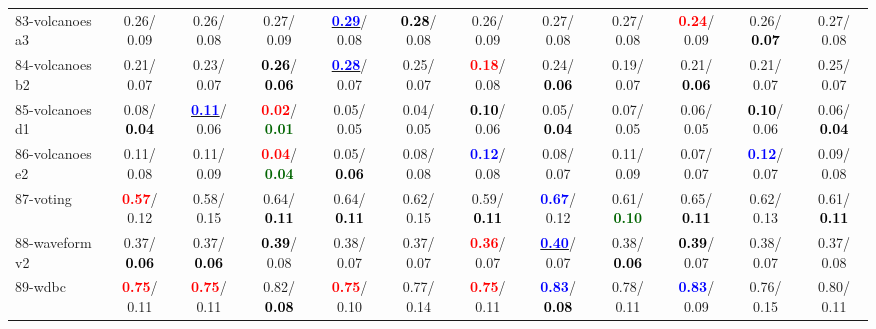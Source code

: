 \begin{table}[h]
\begin{center}
{\begin{tabular}{lc|c|c|c|c|c|c|c|c|c|c}
83-volcanoes a3 &   0.26/  0.09 &   0.26/  0.08 &   0.27/  0.09 & \underline{\textcolor{blue}{\textbf{  0.29}}}/  0.08 & \textcolor{black}{\textbf{  0.28}}/  0.08 &   0.26/  0.09 &   0.27/  0.08 &   0.27/  0.08 & \textcolor{red}{\textbf{  0.24}}/  0.09 &   0.26/\textcolor{black}{\textbf{  0.07}} &   0.27/  0.08 \\
84-volcanoes b2 &   0.21/  0.07 &   0.23/  0.07 & \textcolor{black}{\textbf{  0.26}}/\textcolor{black}{\textbf{  0.06}} & \underline{\textcolor{blue}{\textbf{  0.28}}}/  0.07 &   0.25/  0.07 & \textcolor{red}{\textbf{  0.18}}/  0.08 &   0.24/\textcolor{black}{\textbf{  0.06}} &   0.19/  0.07 &   0.21/\textcolor{black}{\textbf{  0.06}} &   0.21/  0.07 &   0.25/  0.07 \\
85-volcanoes d1 &   0.08/\textcolor{black}{\textbf{  0.04}} & \underline{\textcolor{blue}{\textbf{  0.11}}}/  0.06 & \textcolor{red}{\textbf{  0.02}}/\textcolor{darkgreen}{\textbf{  0.01}} &   0.05/  0.05 &   0.04/  0.05 & \textcolor{black}{\textbf{  0.10}}/  0.06 &   0.05/\textcolor{black}{\textbf{  0.04}} &   0.07/  0.05 &   0.06/  0.05 & \textcolor{black}{\textbf{  0.10}}/  0.06 &   0.06/\textcolor{black}{\textbf{  0.04}} \\ \hline
86-volcanoes e2 &   0.11/  0.08 &   0.11/  0.09 & \textcolor{red}{\textbf{  0.04}}/\textcolor{darkgreen}{\textbf{  0.04}} &   0.05/\textcolor{black}{\textbf{  0.06}} &   0.08/  0.08 & \textcolor{blue}{\textbf{  0.12}}/  0.08 &   0.08/  0.07 &   0.11/  0.09 &   0.07/  0.07 & \textcolor{blue}{\textbf{  0.12}}/  0.07 &   0.09/  0.08 \\
87-voting & \textcolor{red}{\textbf{  0.57}}/  0.12 &   0.58/  0.15 &   0.64/\textcolor{black}{\textbf{  0.11}} &   0.64/\textcolor{black}{\textbf{  0.11}} &   0.62/  0.15 &   0.59/\textcolor{black}{\textbf{  0.11}} & \textcolor{blue}{\textbf{  0.67}}/  0.12 &   0.61/\textcolor{darkgreen}{\textbf{  0.10}} &   0.65/\textcolor{black}{\textbf{  0.11}} &   0.62/  0.13 &   0.61/\textcolor{black}{\textbf{  0.11}} \\
88-waveform v2 &   0.37/\textcolor{black}{\textbf{  0.06}} &   0.37/\textcolor{black}{\textbf{  0.06}} & \textcolor{black}{\textbf{  0.39}}/  0.08 &   0.38/  0.07 &   0.37/  0.07 & \textcolor{red}{\textbf{  0.36}}/  0.07 & \underline{\textcolor{blue}{\textbf{  0.40}}}/  0.07 &   0.38/\textcolor{black}{\textbf{  0.06}} & \textcolor{black}{\textbf{  0.39}}/  0.07 &   0.38/  0.07 &   0.37/  0.08 \\
89-wdbc & \textcolor{red}{\textbf{  0.75}}/  0.11 & \textcolor{red}{\textbf{  0.75}}/  0.11 &   0.82/\textcolor{black}{\textbf{  0.08}} & \textcolor{red}{\textbf{  0.75}}/  0.10 &   0.77/  0.14 & \textcolor{red}{\textbf{  0.75}}/  0.11 & \textcolor{blue}{\textbf{  0.83}}/\textcolor{black}{\textbf{  0.08}} &   0.78/  0.11 & \textcolor{blue}{\textbf{  0.83}}/  0.09 &   0.76/  0.15 &   0.80/  0.11 \\

\end{tabular}}
\end{center}
\end{table}
